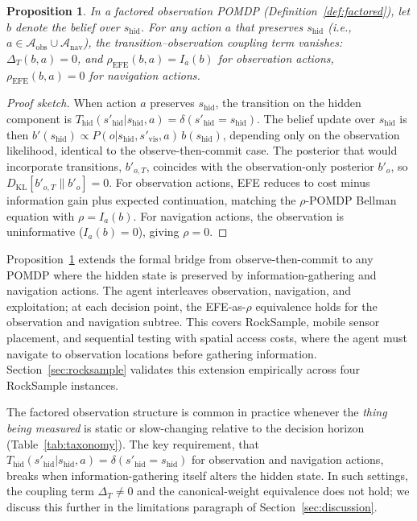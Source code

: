 \documentclass{article}
\newtheorem{proposition}{Proposition}[section]
\begin{document}
\begin{proposition}
\label{prop:factored}
In a factored observation POMDP (Definition~\ref{def:factored}), let $b$ denote the belief over $s_{\mathrm{hid}}$. For any action $a$ that preserves $s_{\mathrm{hid}}$ (i.e., $a \in \mathcal{A}_{\mathrm{obs}} \cup \mathcal{A}_{\mathrm{nav}}$), the transition--observation coupling term vanishes: $\Delta_T(b, a) = 0$, and $\rho_{\mathrm{EFE}}(b, a) = I_a(b)$ for observation actions, $\rho_{\mathrm{EFE}}(b, a) = 0$ for navigation actions.
\end{proposition}

\begin{proof}[Proof sketch]
When action $a$ preserves $s_{\mathrm{hid}}$, the transition on the hidden component is $T_{\mathrm{hid}}(s'_{\mathrm{hid}} | s_{\mathrm{hid}}, a) = \delta(s'_{\mathrm{hid}} = s_{\mathrm{hid}})$. The belief update over $s_{\mathrm{hid}}$ is then $b'(s_{\mathrm{hid}}) \propto P(o | s_{\mathrm{hid}}, s'_{\mathrm{vis}}, a)\, b(s_{\mathrm{hid}})$, depending only on the observation likelihood, identical to the observe-then-commit case. The posterior that would incorporate transitions, $b'_{o,T}$, coincides with the observation-only posterior $b'_o$, so $D_{\mathrm{KL}}[b'_{o,T} \| b'_o] = 0$. For observation actions, EFE reduces to cost minus information gain plus expected continuation, matching the $\rho$-POMDP Bellman equation with $\rho = I_a(b)$. For navigation actions, the observation is uninformative ($I_a(b) = 0$), giving $\rho = 0$.
\end{proof}

Proposition~\ref{prop:factored} extends the formal bridge from observe-then-commit to any POMDP where the hidden state is preserved by information-gathering and navigation actions. The agent interleaves observation, navigation, and exploitation; at each decision point, the EFE-as-$\rho$ equivalence holds for the observation and navigation subtree. This covers RockSample, mobile sensor placement, and sequential testing with spatial access costs, where the agent must navigate to observation locations before gathering information. Section~\ref{sec:rocksample} validates this extension empirically across four RockSample instances.

The factored observation structure is common in practice whenever the \emph{thing being measured} is static or slow-changing relative to the decision horizon (Table~\ref{tab:taxonomy}). The key requirement, that $T_{\mathrm{hid}}(s'_{\mathrm{hid}} | s_{\mathrm{hid}}, a) = \delta(s'_{\mathrm{hid}} = s_{\mathrm{hid}})$ for observation and navigation actions, breaks when information-gathering itself alters the hidden state. In such settings, the coupling term $\Delta_T \neq 0$ and the canonical-weight equivalence does not hold; we discuss this further in the limitations paragraph of Section~\ref{sec:discussion}.
\end{document}
